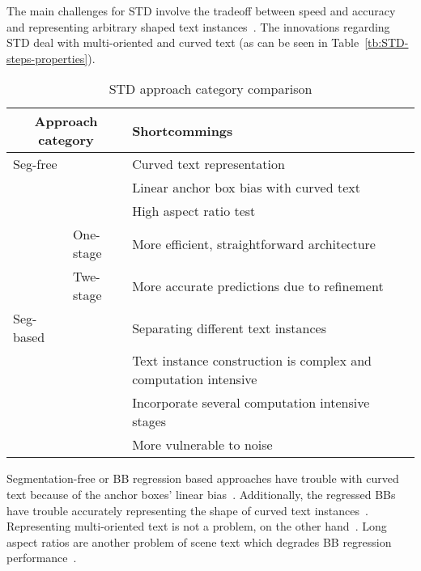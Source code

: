 The main challenges for \ac{STD} involve the tradeoff between speed and accuracy and
representing arbitrary shaped text instances~\citep{wang_efficient_2019}.
The innovations regarding \ac{STD} deal with multi-oriented and curved text (as can be seen in
Table~\ref{tb:STD-steps-properties}).
\begin{table}[h]
    \centering\scriptsize
    \begin{tabular}{p{}p{}p{}}
        \multicolumn{2}{c}{\textbf{Approach category}} & \textbf{Shortcommings} \\
        \toprule
        Seg-free & & Curved text representation~\citep{long_scene_2021,wang_shape_2019} \\
        & & Linear anchor box bias with curved text~\citep{wang_shape_2019,ferrari_textsnake_2018} \\
        & & High aspect ratio test~\citep{shi_detecting_2017,long_scene_2021} \\
        & One-stage & More efficient, straightforward architecture~\citep{lu_mimicdet_2020} \\
        & Twe-stage & More accurate predictions due to refinement~\citep{lu_mimicdet_2020} \\
        \midrule
        Seg-based & & Separating different text instances~\citep{wang_shape_2019} \\
        & & Text instance construction is complex and computation
            intensive~\citep{xie_aggregation_2019,liao_real-time_2019,qiao_text_2021} \\
        & & Incorporate several computation intensive stages~\citep{dai_fused_2018} \\
        & & More vulnerable to noise~\citep{long_scene_2021} \\
        \bottomrule
    \end{tabular}
    \caption{STD approach category comparison\label{tb:STD-comparison}}
\end{table}
Segmentation-free or \ac{BB} regression based approaches have trouble with curved text because of
the anchor boxes' linear bias~\citep{wang_shape_2019,ferrari_textsnake_2018}.
Additionally, the regressed \acp{BB} have trouble accurately representing the shape of curved
text instances~\citep{long_scene_2021,wang_shape_2019}.
Representing multi-oriented text is not a problem, on the other
hand~\citep{liao_textboxes_2018,jiang_r2cnn_2017}.
Long aspect ratios are another problem of scene text which degrades \ac{BB} regression
performance~\citep{shi_detecting_2017,long_scene_2021}.

